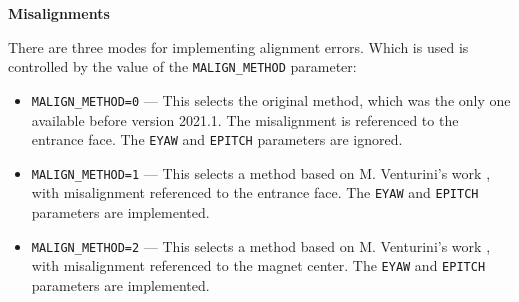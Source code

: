 {\bf Misalignments}

There are three modes for implementing alignment errors. Which is used
is controlled by the value of the \verb|MALIGN_METHOD| parameter:
\begin{itemize}
\item \verb|MALIGN_METHOD=0| --- This selects the original method, which was
  the only one available before version 2021.1. The misalignment is
  referenced to the entrance face. The \verb|EYAW| and \verb|EPITCH| parameters
  are ignored.
\item \verb|MALIGN_METHOD=1| --- This selects a method based on M. Venturini's
  work \cite{Venturini2021}, with misalignment referenced to the entrance face.
  The \verb|EYAW| and \verb|EPITCH| parameters are implemented.
\item \verb|MALIGN_METHOD=2| --- This selects a method based on M. Venturini's
  work \cite{Venturini2021}, with misalignment referenced to the magnet center.
  The \verb|EYAW| and \verb|EPITCH| parameters are implemented.
\end{itemize}

